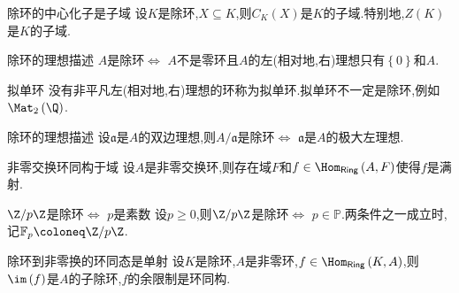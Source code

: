 \begin{proposition}{除环的中心化子是子域}{}
	设$K$是除环,$X\subseteq K$,则$C_{K}\left(X\right)$是$K$的子域.特别地,$Z\left(K\right)$是$K$的子域.
\end{proposition}

\begin{theorem}{除环的理想描述}{}
	$A$是除环$\iff$ $A$不是零环且$A$的左(相对地,右)理想只有$\left\{0\right\}$和$A$.
\end{theorem}

\begin{remark}{拟单环}{}
	没有非平凡左(相对地,右)理想的环称为拟单环.拟单环不一定是除环,例如$\Mat_{2}\left(\Q\right)$.
\end{remark}

\begin{corollary}{除环的理想描述}{}
	设$\mathfrak{a}$是$A$的双边理想,则$A/\mathfrak{a}$是除环$\iff$ $\mathfrak{a}$是$A$的极大左理想.
\end{corollary}

\begin{corollary}{非零交换环同构于域}{}
	设$A$是非零交换环,则存在域$F$和$f\in\Hom_{\mathsf{Ring}}\left(A,F\right)$使得$f$是满射.
\end{corollary}

\begin{corollary}{$\Z/p\Z$是除环$\iff$ $p$是素数}{}
	设$p\geq 0$,则$\Z/p\Z$是除环$\iff$ $p\in\mathbb{P}$.两条件之一成立时,记$\mathbb{F}_{p}\coloneq\Z/p\Z$.
\end{corollary}

\begin{theorem}{除环到非零换的环同态是单射}{}
	设$K$是除环,$A$是非零环,$f\in\Hom_{\mathsf{Ring}}\left(K,A\right)$,则$\im\left(f\right)$是$A$的子除环,$f$的余限制是环同构.
\end{theorem}























